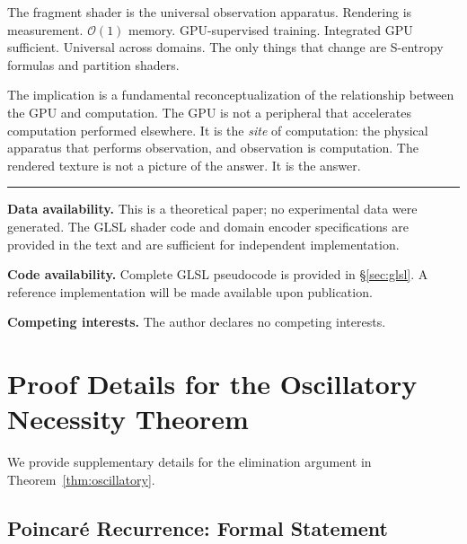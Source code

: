 \documentclass[11pt,twocolumn,a4paper]{article}
\newcommand{\BigO}{\mathcal{O}}
\begin{document}
The fragment shader is the universal observation apparatus.
Rendering is measurement. $\BigO(1)$ memory. GPU-supervised training.
Integrated GPU sufficient. Universal across domains. The only things
that change are S-entropy formulas and partition shaders.

The implication is a fundamental reconceptualization of the
relationship between the GPU and computation. The GPU is not a
peripheral that accelerates computation performed elsewhere. It is the
\emph{site} of computation: the physical apparatus that performs
observation, and observation is computation. The rendered texture is
not a picture of the answer. It is the answer.

\vspace{12pt}
\noindent\rule{\columnwidth}{0.4pt}
\vspace{4pt}

{\small
\noindent\textbf{Data availability.}
This is a theoretical paper; no experimental data were generated.
The GLSL shader code and domain encoder specifications are provided
in the text and are sufficient for independent implementation.

\noindent\textbf{Code availability.}
Complete GLSL pseudocode is provided in \S\ref{sec:glsl}. A reference
implementation will be made available upon publication.

\noindent\textbf{Competing interests.}
The author declares no competing interests.
}








\appendix

\section{Proof Details for the Oscillatory Necessity Theorem}
\label{app:oscillatory}

We provide supplementary details for the elimination argument in
Theorem~\ref{thm:oscillatory}.

\subsection{Poincar\'{e} Recurrence: Formal Statement}
\end{document}

